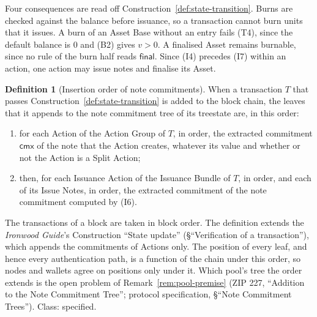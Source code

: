 \documentclass[11pt,a4paper]{article}
\theoremstyle{definition}
\newtheorem{definition}[theorem]{Definition}
\newcommand{\cmx}{\mathsf{cmx}}
\begin{document}
Four consequences are read off Construction~\ref{def:state-transition}.
Burns are checked against the balance before issuance, so a transaction
cannot burn units that it issues. A burn of an Asset Base without an entry
fails (T4), since the default balance is $0$ and (B2) gives $v > 0$. A
finalised Asset remains burnable, since no rule of the burn half reads
$\mathsf{final}$. Since (I4) precedes (I7) within an action, one action may
issue notes and finalise its Asset.

\begin{definition}[Insertion order of note commitments]\label{def:tree-order}
When a transaction $T$ that passes Construction~\ref{def:state-transition}
is added to the block chain, the leaves that it appends to the note
commitment tree of its treestate are, in this order:
\begin{enumerate}
\item for each Action of the Action Group of $T$, in order, the extracted
  commitment $\cmx$ of the note that the Action creates, whatever its value
  and whether or not the Action is a Split Action;
\item then, for each Issuance Action of the Issuance Bundle of $T$, in
  order, and each of its Issue Notes, in order, the extracted commitment of
  the note commitment computed by (I6).
\end{enumerate}
The transactions of a block are taken in block order. The definition
extends the \emph{Ironwood Guide}'s Construction ``State update''
(\S``Verification of a transaction''), which appends the commitments of
Actions only. The position of every leaf, and hence every authentication
path, is a function of the chain under this order, so nodes and wallets
agree on positions only under it. Which pool's tree the order extends is the
open problem of Remark~\ref{rem:pool-premise} (ZIP 227, ``Addition to the
Note Commitment Tree''; protocol specification, \S``Note Commitment
Trees''). Class: specified.
\end{definition}
\end{document}
